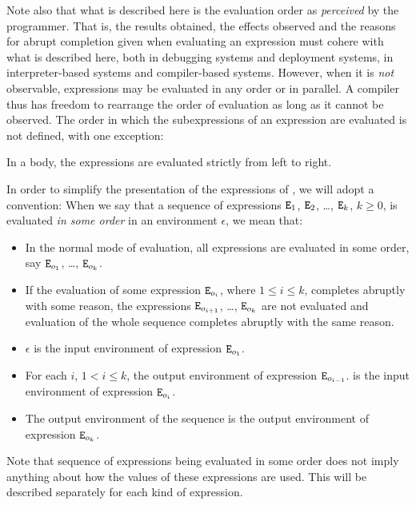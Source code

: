 Note also that what is described here is the evaluation order as
\emph{perceived} by the programmer.  That is, the results obtained,
the effects observed and the reasons for abrupt completion given when
evaluating an expression must cohere with what is described here, both
in debugging systems and deployment systems, in interpreter-based
systems and compiler-based systems.  However, when it is \emph{not}
observable, expressions may be evaluated in any order or in
parallel. A compiler thus has freedom to rearrange the order of
evaluation as long as it cannot be observed.
\fi %
\ifOld
The order in which the subexpressions of an expression are evaluated
is not defined, with one exception:
\begin{textdisplay}
In a body, the expressions are evaluated strictly from left to right.
\end{textdisplay}
In order to simplify the presentation of the expressions of \Erlang,
we will adopt a convention:
When we say that a sequence of expressions
$\TZ{E}_1$, $\TZ{E}_2$, \ldots, $\TZ{E}_k$, $k\geq0$, is evaluated
\emph{in some order}
in an environment $\epsilon$, we mean that:
\begin{itemize}
\item In the normal mode of evaluation, all expressions are evaluated in some
order, say ${\tt{\sl E}}_{o_1}$, \ldots, ${\tt{\sl E}}_{o_k}$.
\item If the evaluation of some expression ${\tt{\sl E}}_{o_i}$, where $1\leq i\leq k$,
completes abruptly with some reason, the expressions
${\tt{\sl E}}_{o_{i+1}}$, \ldots, ${\tt{\sl E}}_{o_k}$
are not evaluated and evaluation of the whole sequence completes abruptly with
the same reason.
\item $\epsilon$ is the input environment of expression ${\tt{\sl E}}_{o_1}$.
\item For each $i$, $1< i\leq k$, the output environment of
expression ${\tt{\sl E}}_{o_{i-1}}$. is the input environment of expression ${\tt{\sl E}}_{o_i}$.
\item The output environment of the sequence is the output environment of
expression ${\tt{\sl E}}_{o_k}$.
\end{itemize}
Note that sequence of expressions being evaluated in some order does not
imply anything about how the values of these expressions are used.  This
will be described separately for each kind of expression.

\iffalse
\index{evaluation!left-to-right|(}
When we say that a sequence of expressions
$\TZ{E}_1$, $\TZ{E}_2$, \ldots, $\TZ{E}_k$, $k\geq0$, is evaluated
\emph{left-to-right}, we mean the same except that it is required that for each $i$,
$1\leq i\leq k$, $o_i=i$.
\index{evaluation!left-to-right|)}
\fi

